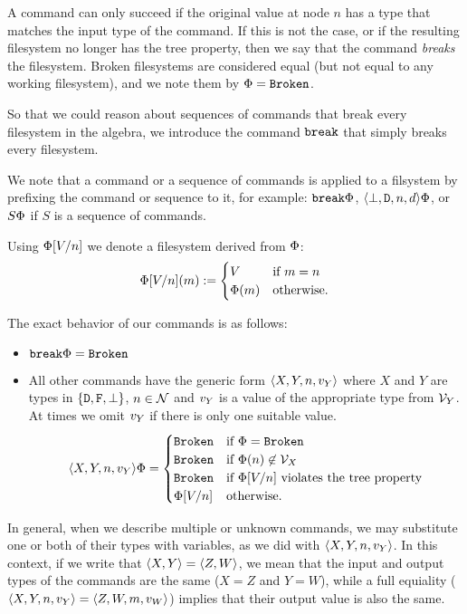 A command can only succeed if the original value at node $n$ has a type that matches
the input type of the command. If this is not the case, or if the resulting
filesystem no longer has the tree property, then we say that the command
{\em breaks} the filesystem. Broken filesystems are considered equal
(but not equal to any working filesystem), and we note them by $\Phi=\mathtt{Broken}$.

So that we could reason about sequences of commands that break every filesystem
in the algebra, we introduce the command $\mathtt{break}$ that simply breaks every filesystem.

We note that a command or a sequence of commands is applied to a filsystem
by prefixing the command or sequence to it, for example: $\mathtt{break}\Phi$, $\langle{\bot,\mathtt{D},n,d}\rangle\Phi$, 
or $S\Phi$ if $S$ is a sequence of commands.

\begin{mydef}
Using $\Phi[V/n]$ we denote a filesystem derived from $\Phi$:
\[ \Phi[V/n](m) :=
   \begin{cases}
   V &\mbox{if~} m=n\\
   \Phi(m) &\mbox{otherwise.}
   \end{cases}
\]
\end{mydef}

The exact behavior of our commands is as follows:
\begin{itemize}
\item $\mathtt{break}\Phi = \mathtt{Broken}$
\item
All other commands have the generic form $\langle{X,Y,n,v_Y}\rangle$ where
$X$ and $Y$ are types in $\{\mathtt{D},\mathtt{F},\bot\}$,
$n\in\mathcal{N}$ and $v_Y$ is a value of the appropriate type from $\mathcal{V}_{Y}$.
At times we omit $v_Y$ if there is only one suitable value.
\[ \langle{X,Y,n,v_Y}\rangle\Phi = 
   \begin{cases}
   \mathtt{Broken} &\mbox{if~} \Phi=\mathtt{Broken}\\
   \mathtt{Broken} &\mbox{if~} \Phi(n)\not\in\mathcal{V}_{X}\\
   \mathtt{Broken} &\mbox{if~} \Phi[V/n] \mbox{~violates the tree property}\\
   \Phi[V/n] &\mbox{otherwise.}
   \end{cases}
\]
\end{itemize}


In general, when we describe multiple or unknown commands, we may substitute one or both
of their types with variables, as we did with $\langle{X,Y,n,v_Y}\rangle$. In this context,
if we write that $\langle{X,Y}\rangle=\langle{Z,W}\rangle$, we mean that the input and output types %
of the commands are the same ($X=Z$ and $Y=W$), while a full equiality 
($\langle{X,Y,n,v_Y}\rangle=\langle{Z,W,m,v_W}\rangle$)
implies
that their output value is also the same.

